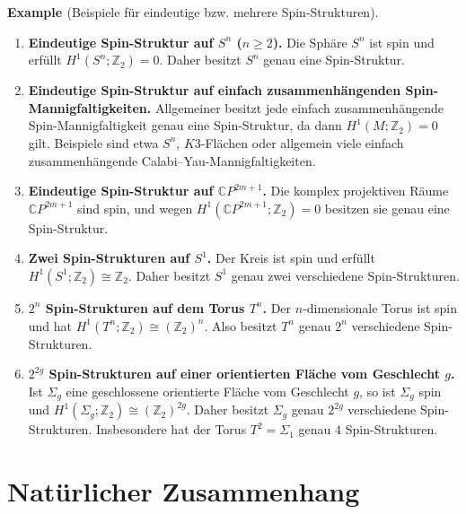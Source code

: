 \documentclass[10pt, letterpaper]{article}
\newcommand{\Z}{\mathbb{Z}}
\newcommand{\CP}{\mathbb{C} P}
\newcommand{\CustomHeading}[3]{%
  \par\medskip\noindent%
  \textbf{#1 #2} \textnormal{(#3)}.\enskip%
}
\newenvironment{EXA}[2]{\CustomHeading{Example}{#1}{#2}}{}
\begin{document}
\begin{EXA}{\parencite[p.~85-93]{LawsonMichelsohn2016}}{Beispiele für eindeutige bzw. mehrere Spin-Strukturen}
\begin{enumerate}
    \item \textbf{Eindeutige Spin-Struktur auf \(S^n\) (\(n\ge 2\)).}  
    Die Sphäre \(S^n\) ist spin und erfüllt $H^1(S^n;\Z_2)=0$. Daher besitzt \(S^n\) genau eine Spin-Struktur.

    \item \textbf{Eindeutige Spin-Struktur auf einfach zusammenhängenden Spin-Mannigfaltigkeiten.}  
    Allgemeiner besitzt jede einfach zusammenhängende Spin-Mannigfaltigkeit genau eine Spin-Struktur, da dann $H^1(M;\Z_2)=0$ gilt. Beispiele sind etwa \(S^n\), \(K3\)-Flächen oder allgemein viele einfach zusammenhängende Calabi--Yau-Mannigfaltigkeiten.

    \item \textbf{Eindeutige Spin-Struktur auf \(\CP^{2m+1}\).}  
    Die komplex projektiven Räume \(\CP^{2m+1}\) sind spin, und wegen $H^1(\CP^{2m+1};\Z_2)=0$ besitzen sie genau eine Spin-Struktur.

    \item \textbf{Zwei Spin-Strukturen auf \(S^1\).}  
    Der Kreis ist spin und erfüllt $H^1(S^1;\Z_2)\cong \Z_2$. Daher besitzt \(S^1\) genau zwei verschiedene Spin-Strukturen.

    \item \textbf{\(2^n\) Spin-Strukturen auf dem Torus \(T^n\).}  
    Der \(n\)-dimensionale Torus ist spin und hat $H^1(T^n;\Z_2)\cong (\Z_2)^n$.
    Also besitzt \(T^n\) genau $2^n$ verschiedene Spin-Strukturen.

    \item \textbf{\(2^{2g}\) Spin-Strukturen auf einer orientierten Fläche vom Geschlecht \(g\).}  
    Ist \(\Sigma_g\) eine geschlossene orientierte Fläche vom Geschlecht \(g\), so ist \(\Sigma_g\) spin und $H^1(\Sigma_g;\Z_2)\cong (\Z_2)^{2g}$. Daher besitzt \(\Sigma_g\) genau $2^{2g}$ verschiedene Spin-Strukturen. Insbesondere hat der Torus \(T^2=\Sigma_1\) genau \(4\) Spin-Strukturen.

\end{enumerate}

\end{EXA}


\bigskip



\section{Natürlicher Zusammenhang}
\end{document}
